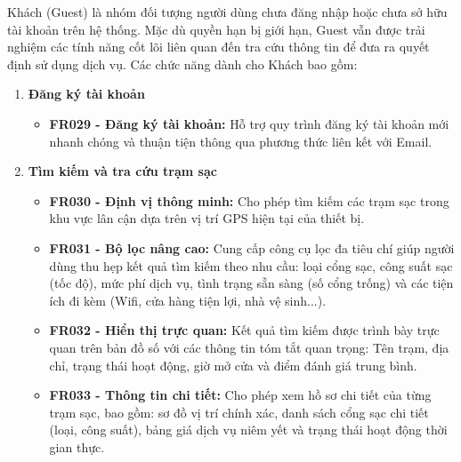 Khách (Guest) là nhóm đối tượng người dùng chưa đăng nhập hoặc chưa sở hữu tài khoản trên hệ thống. Mặc dù quyền hạn bị giới hạn, Guest vẫn được trải nghiệm các tính năng cốt lõi liên quan đến tra cứu thông tin để đưa ra quyết định sử dụng dịch vụ. Các chức năng dành cho Khách bao gồm:
\begin{enumerate}[label=\textbf{\alph*)}]
    \item \textbf{Đăng ký tài khoản}
    \begin{itemize}
        \item \textbf{FR029 - Đăng ký tài khoản:} Hỗ trợ quy trình đăng ký tài khoản mới nhanh chóng và thuận tiện thông qua phương thức liên kết với Email.
    \end{itemize}
    \item \textbf{Tìm kiếm và tra cứu trạm sạc}
    \begin{itemize}
        \item \textbf{FR030 - Định vị thông minh:} Cho phép tìm kiếm các trạm sạc trong khu vực lân cận dựa trên vị trí GPS hiện tại của thiết bị.
        \item \textbf{FR031 - Bộ lọc nâng cao:} Cung cấp công cụ lọc đa tiêu chí giúp người dùng thu hẹp kết quả tìm kiếm theo nhu cầu: loại cổng sạc, công suất sạc (tốc độ), mức phí dịch vụ, tình trạng sẵn sàng (số cổng trống) và các tiện ích đi kèm (Wifi, cửa hàng tiện lợi, nhà vệ sinh...).
        \item \textbf{FR032 - Hiển thị trực quan:} Kết quả tìm kiếm được trình bày trực quan trên bản đồ số với các thông tin tóm tắt quan trọng: Tên trạm, địa chỉ, trạng thái hoạt động, giờ mở cửa và điểm đánh giá trung bình.
        \item \textbf{FR033 - Thông tin chi tiết:} Cho phép xem hồ sơ chi tiết của từng trạm sạc, bao gồm: sơ đồ vị trí chính xác, danh sách cổng sạc chi tiết (loại, công suất), bảng giá dịch vụ niêm yết và trạng thái hoạt động thời gian thực.
    \end{itemize}
\end{enumerate}


